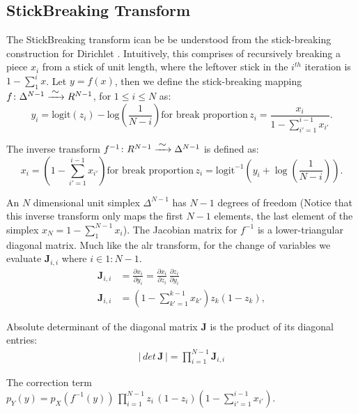 \documentclass[11pt]{article}
\newcommand{\abs}[1]{\left| #1 \right|}
\begin{document}
\subsection{StickBreaking Transform}

The StickBreaking transform ican be be understood from the stick-breaking construction for Dirichlet \cite{sethuraman1994constructive}. Intuitively, this comprises of recursively breaking a piece $x_i$ from a stick of unit length, where the leftover stick in the $i^{th}$ iteration is $ 1 - \sum_{1}^{i}x$. Let $y = f(x)$, then we define the stick-breaking mapping $ f \colon \Delta^{N-1} \xrightarrow{\makebox[0.4cm]{$\sim$}}  R^{N-1}$, for $1 \leq i \leq N$ as:	
\[
y_i
= \mathrm{logit}(z_i) - \mbox{log}\left(\frac{1}{N-i}
   \right) \text{for break proportion} \, 
   z_i = \frac{x_i}{1 - \sum_{i' = 1}^{i-1} x_{i'}}.
\]

The inverse transform $ f^{-1} \colon R^{N-1} \xrightarrow{\makebox[0.4cm]{$\sim$}}  \Delta^{N-1}$ is defined as:
\[
x_i =
\left( 1 - \sum_{i'=1}^{i-1} x_{i'} \right) \text{for break proportion} \, z_i = \mathrm{logit}^{-1} \left( y_i
                             + \log \left( \frac{1}{N - i}
                                            \right)\right).
                                            \]
                            
An $N$ dimensional unit simplex $\Delta^{N-1}$ has $N-1$ degrees of freedom (Notice that this inverse transform only maps the first $N-1$ elements, the last element of the simplex $x_{N} = 1 - \sum_1^{N-1}{x_i}$). The Jacobian matrix for $f^{-1}$ is a lower-triangular diagonal matrix. Much like the alr transform, for the change of variables we evaluate $\mathbf{J}_{i, i}$ where $i \in 1:N-1$.
\begin{align*}
\mathbf{J}_{i, i} &= \frac{\partial x_i}{\partial y_i}
=
\frac{\partial x_i}{\partial z_i} \,
\frac{\partial z_i}{\partial y_i}\\
\mathbf{J}_{i, i} &= \left(
  1 - \sum_{k' = 1}^{k-1} x_{k'}
   \right) z_k (1 - z_k),
\end{align*}

Absolute determinant of the diagonal matrix $\mathbf{J}$ is the product of its diagonal entries:
\begin{align*}
	\abs{\, det \, \textbf{J} \,} = \prod_{i=1}^{N-1} \textbf{J}_{i,i}
\end{align*}

The correction term $p_Y(y) = p_X(f^{-1}(y))\,
\prod_{i=1}^{N-1}z_i\,(1 - z_i)\left(1 - \sum_{i'=1}^{i-1} x_{i'}\right).$
\end{document}
